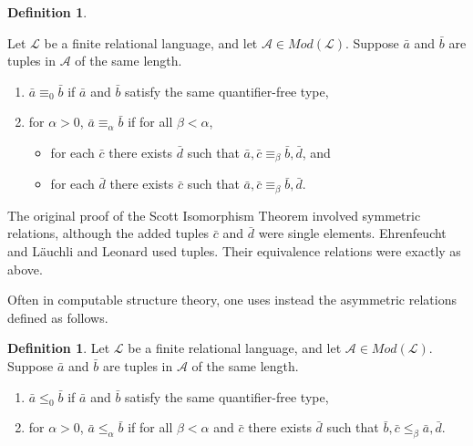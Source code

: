 \documentclass{article}
\theoremstyle{definition}
\newtheorem{defn}[thm]{Definition}
\begin{document}
	\begin{defn}\label{defn:bfsym}
		
		Let $\mathcal{L}$ be a finite relational language, and let $\mathcal{A}\in Mod(\mathcal{L})$. Suppose $\bar{a}$ and $\bar{b}$ are tuples in $\mathcal{A}$ of the same length. 
		
		\begin{enumerate}
			
			\item $\bar{a}\equiv_0\bar{b}$ if $\bar{a}$ and $\bar{b}$ satisfy the same quantifier-free type,
			
			\item for $\alpha > 0$, $\bar{a}\equiv_\alpha\bar{b}$ if for all $\beta <\alpha$,
			\begin{itemize}
				\item for each $\bar{c}$ there exists $\bar{d}$ such that $\bar{a},\bar{c}\equiv_\beta\bar{b},\bar{d}$, and
				\item for each $\bar{d}$ there exists $\bar{c}$ such that $\bar{a},\bar{c}\equiv_\beta\bar{b},\bar{d}$.
			\end{itemize}
			
		\end{enumerate}
		
	\end{defn}
	
	The original proof of the Scott Isomorphism Theorem \cite{Scott} involved symmetric relations, although the added tuples $\bar{c}$ and $\bar{d}$ were single elements. Ehrenfeucht \cite{Ehrenfeucht} and L\"{a}uchli and Leonard \cite{Lauchli} used tuples. Their equivalence relations were exactly as above. 
	
	Often in computable structure theory, one uses instead the asymmetric relations defined as follows.
	\begin{defn}
		
		Let $\mathcal{L}$ be a finite relational language, and let $\mathcal{A}\in Mod(\mathcal{L})$. Suppose $\bar{a}$ and $\bar{b}$ are tuples in $\mathcal{A}$ of the same length. 
		
		\begin{enumerate}
			
			\item $\bar{a}\leq_0\bar{b}$ if $\bar{a}$ and $\bar{b}$ satisfy the same quantifier-free type,
			
			\item for $\alpha > 0$, $\bar{a}\leq_\alpha\bar{b}$ if for all $\beta <\alpha$ and $\bar{c}$ there exists $\bar{d}$ such that $\bar{b},\bar{c}\leq_\beta\bar{a},\bar{d}$.
			
		\end{enumerate}
		
	\end{defn}
	
\end{document}
